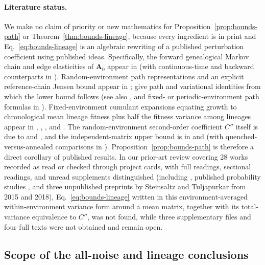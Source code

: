 \paragraph{Literature status.}
We make no claim of priority or new mathematics for Proposition~\ref{prop:bounds-path} or Theorem~\ref{thm:bounds-lineage}, because every ingredient is in print and Eq.~\eqref{eq:bounds-lineage} is an algebraic rewriting of a published perturbation coefficient using published ideas. Specifically, the forward genealogical Markov chain and edge elasticities of $\mathbf{A}_0$ appear in \citet{bienvenu2017} (with continuous-time and backward counterparts in \citealp{demetrius1974,hermisson2002,georgii2003,baake2007,sughiyama2019}). Random-environment path representations and an explicit reference-chain Jensen bound appear in \citet{dombry2011}; \citet{kobayashi2015,kobayashi2017} give path and variational identities from which the lower bound follows (see also \citealp{bansaye2013,bansaye2019}, and fixed- or periodic-environment path formulas in \citealp{leibler2010,lambert2015,garciagarcia2019,genthon2020}). Fixed-environment cumulant expansions equating growth to chronological mean lineage fitness plus half the fitness variance among lineages appear in \citet{nozoe2017}, \citet{levien2020a}, \citet{genthon2021}, and \citet{yamauchi2022}. The random-environment second-order coefficient $C''$ itself is due to \citet{tuljapurkar1982a,tuljapurkar1990} and \citet{tuljapurkar2006}, and the independent-matrix upper bound is in \citet{cohen1979b} and \citet{tuljapurkar1990} (with quenched-versus-annealed comparisons in \citealp{rivoire2011}). Proposition~\ref{prop:bounds-path} is therefore a direct corollary of published results. In our prior-art review covering 28 works recorded as read or checked through project cards, with full readings, sectional readings, and unread supplements distinguished (including \citealp{tuljapurkar1985,rivoire2016,skanata2016,sughiyama2017,levien2020b}, published probability studies \citealp{sagitov2010,steinsaltz2011,hautphenne2016,blath2021}, and three unpublished preprints by Steinsaltz and Tuljapurkar from 2015 and 2018), Eq.~\eqref{eq:bounds-lineage} written in this environment-averaged within-environment variance form around a mean matrix, together with its total-variance equivalence to $C''$, was not found, while three supplementary files \citep{leibler2010,kobayashi2015,sughiyama2017} and four full texts \citep{arnold1994,kussell2006,sughiyama2015,wakamoto2012} were not obtained and remain open.

\subsection{Scope of the all-noise and lineage conclusions}\label{esm:bounds-comparison-scope}

